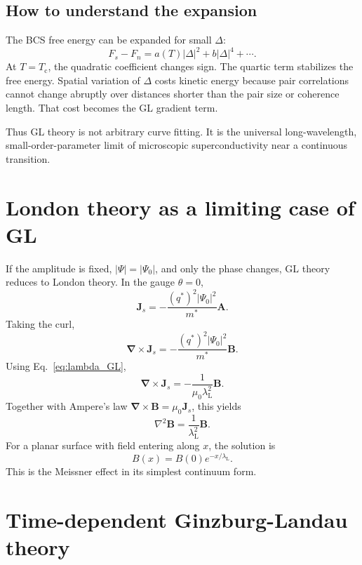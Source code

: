\documentclass[11pt]{article}
\numberwithin{equation}{section}
\newcommand{\Avec}{\bm{A}}
\newcommand{\Bvec}{\bm{B}}
\newcommand{\Jvec}{\bm{J}}
\renewcommand{\grad}{\bm{\nabla}}
\newcommand{\lap}{\nabla^2}
\newcommand{\Tc}{T_{\mathrm{c}}}
\newcommand{\lambdaL}{\lambda_{\mathrm{L}}}
\newcommand{\Ord}{\Psi}
\begin{document}
\subsection{How to understand the expansion}

The BCS free energy can be expanded for small $\Delta$:
\begin{equation}
F_s-F_n=a(T)|\Delta|^2+b|\Delta|^4+\cdots.
\end{equation}
At $T=\Tc$, the quadratic coefficient changes sign. The quartic term stabilizes the free energy. Spatial variation of $\Delta$ costs kinetic energy because pair correlations cannot change abruptly over distances shorter than the pair size or coherence length. That cost becomes the GL gradient term.

Thus GL theory is not arbitrary curve fitting. It is the universal long-wavelength, small-order-parameter limit of microscopic superconductivity near a continuous transition.

\section{London theory as a limiting case of GL}

If the amplitude is fixed, $|\Ord|=|\Ord_0|$, and only the phase changes, GL theory reduces to London theory. In the gauge $\theta=0$,
\begin{equation}
\Jvec_s=-\frac{(q^*)^2|\Ord_0|^2}{m^*}\Avec.
\end{equation}
Taking the curl,
\begin{equation}
\grad\times\Jvec_s=-\frac{(q^*)^2|\Ord_0|^2}{m^*}\Bvec.
\end{equation}
Using Eq.~\eqref{eq:lambda_GL},
\begin{equation}
\boxed{\grad\times\Jvec_s=-\frac{1}{\mu_0\lambdaL^2}\Bvec.}
\end{equation}
Together with Ampere's law $\grad\times\Bvec=\mu_0\Jvec_s$, this yields
\begin{equation}
\lap\Bvec=\frac{1}{\lambdaL^2}\Bvec.
\end{equation}
For a planar surface with field entering along $x$, the solution is
\begin{equation}
B(x)=B(0)e^{-x/\lambdaL}.
\end{equation}
This is the Meissner effect in its simplest continuum form.

\section{Time-dependent Ginzburg-Landau theory}
\end{document}
